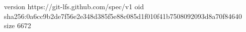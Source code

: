 version https://git-lfs.github.com/spec/v1
oid sha256:0a6cc9b2de7f56e2e348d385f5e88c085d1f010f41b7508092093d8a70f84640
size 6672

